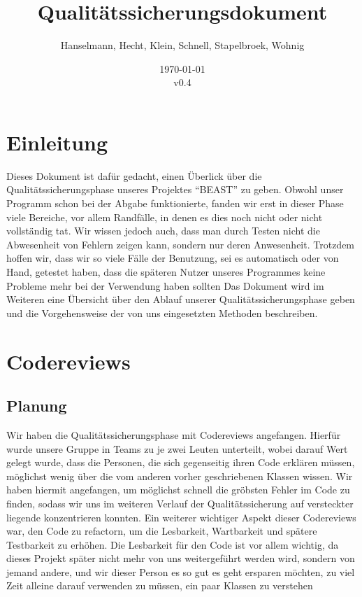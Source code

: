 \documentclass[a4paper]{scrreprt}
\begin{document}
\title{Qualitätssicherungsdokument}
\author{Hanselmann, Hecht, Klein, Schnell, Stapelbroek, Wohnig}
\date{\today\\v0.4}
\maketitle 
\tableofcontents	

\chapter{Einleitung}
Dieses Dokument ist dafür gedacht, einen Überlick über die
Qualitätssicherungsphase unseres Projektes "`BEAST"' zu geben. Obwohl unser
Programm schon bei der Abgabe funktionierte, fanden wir erst in dieser Phase
viele Bereiche, vor allem Randfälle, in denen es dies noch nicht oder nicht
vollständig tat.
Wir wissen jedoch auch, dass man durch Testen nicht die Abwesenheit von Fehlern
zeigen kann, sondern nur deren Anwesenheit. Trotzdem hoffen wir, dass wir
so viele Fälle der Benutzung, sei es automatisch oder von Hand, getestet haben,
dass die späteren Nutzer unseres Programmes keine Probleme mehr bei der
Verwendung haben sollten
\newline
Das Dokument wird im Weiteren eine Übersicht über den Ablauf unserer
Qualitätssicherungsphase geben und die Vorgehensweise der von uns eingesetzten
Methoden beschreiben.

\chapter{Codereviews}

\section{Planung}
Wir haben die Qualitätssicherungsphase mit Codereviews angefangen.
Hierfür wurde unsere Gruppe in Teams zu je zwei Leuten unterteilt, wobei
darauf Wert gelegt wurde, dass die Personen, die sich gegenseitig ihren Code
erklären müssen, möglichst wenig über die vom anderen vorher geschriebenen
Klassen wissen.
\newline
Wir haben hiermit
angefangen, um möglichst schnell die gröbsten Fehler im Code zu finden, sodass
wir uns im weiteren Verlauf der Qualitätssicherung auf versteckter liegende konzentrieren
konnten. Ein weiterer wichtiger Aspekt dieser Codereviews war, den Code zu
refactorn, um die Lesbarkeit, Wartbarkeit und spätere Testbarkeit zu erhöhen.
\newline
Die Lesbarkeit für den Code ist vor allem wichtig, da dieses Projekt später
nicht mehr von uns weitergeführt werden wird, sondern von jemand andere, und wir
dieser Person es so gut es geht ersparen möchten, zu viel Zeit alleine darauf
verwenden zu müssen, ein paar Klassen zu verstehen
\end{document}
